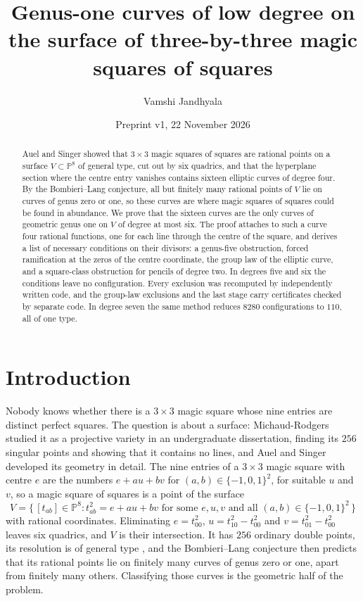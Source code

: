 \documentclass[11pt]{amsart}
\title[Genus-one curves on the magic-square-of-squares surface]{Genus-one curves of low degree on the surface of
three-by-three magic squares of squares}
\author{Vamshi Jandhyala}
\date{Preprint v1, 22 November 2026}
\theoremstyle{definition}
\newcommand{\PP}{\mathbb{P}}
\begin{document}
\begin{abstract}
Auel and Singer showed that $3\times3$ magic squares of squares are rational points on a surface $V\subset\PP^8$ of
general type, cut out by six quadrics, and that the hyperplane section where the centre entry vanishes contains
sixteen elliptic curves of degree four. By the Bombieri--Lang conjecture, all but finitely many rational points of
$V$ lie on curves of genus zero or one, so these curves are where magic squares of squares could be found in
abundance. We prove that the sixteen curves are the only curves of geometric genus one on $V$ of degree at most six.
The proof attaches to such a curve four rational functions, one for each line through the centre of the square, and
derives a list of necessary conditions on their divisors: a genus-five obstruction, forced ramification at the zeros
of the centre coordinate, the group law of the elliptic curve, and a square-class obstruction for pencils of degree
two. In degrees five and six the conditions leave no configuration. Every exclusion was recomputed by independently
written code, and the group-law exclusions and the last stage carry certificates checked by separate code. In degree seven the same method reduces $8280$ configurations to $110$, all of one
type.
\end{abstract}

\maketitle

\section{Introduction}

Nobody knows whether there is a $3\times3$ magic square whose nine entries are distinct perfect squares. The question is
about a surface: Michaud-Rodgers \cite{MR} studied it as a projective variety in an undergraduate dissertation,
finding its $256$ singular points and showing that it contains no lines, and Auel and Singer \cite{AS} developed
its geometry in detail. The nine entries of a $3\times3$ magic square with centre $e$ are
the numbers $e+au+bv$ for $(a,b)\in\{-1,0,1\}^2$, for suitable $u$ and $v$, so a magic square of squares is a point of the surface
\[
V=\{\,[t_{ab}]\in\PP^8 : t_{ab}^2=e+au+bv \text{ for some } e,u,v \text{ and all } (a,b)\in\{-1,0,1\}^2\,\}
\]
with rational coordinates. Eliminating $e=t_{00}^2$, $u=t_{10}^2-t_{00}^2$ and $v=t_{01}^2-t_{00}^2$ leaves six
quadrics, and $V$ is their intersection. It has $256$ ordinary double points, its resolution is of general type
\cite{AS}, and the Bombieri--Lang conjecture then predicts that its rational points lie on finitely many curves
of genus zero or one, apart from finitely many others. Classifying those curves is the geometric half of the problem.
\end{document}
